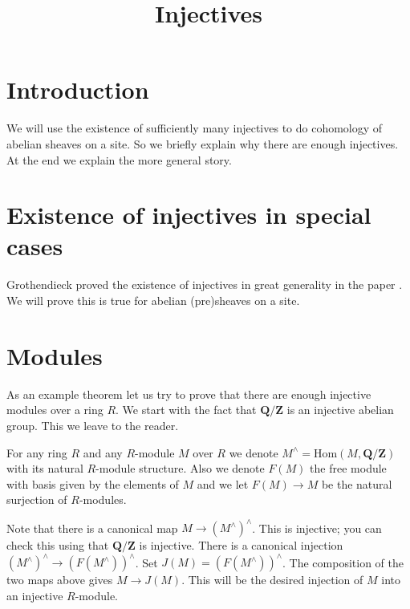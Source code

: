 

%


\title{Injectives}


\maketitle

\tableofcontents

\section{Introduction}
\label{section-introduction}

\noindent
We will use the existence of sufficiently many injectives to
do cohomology of abelian sheaves on a site. So we briefly 
explain why there are enough injectives. At the end we explain
the more general story.

\section{Existence of injectives in special cases}
\label{section-foundational}

\noindent
Grothendieck proved the existence of injectives in great generality 
in the paper \cite{Tohoku}. We will prove this is true for abelian
(pre)sheaves on a site.

\section{Modules}
\label{section-injectives-modules}

\noindent 
As an example theorem let us try to prove that there are enough injective
modules over a ring $R$. We start with the fact that $\mathbf{Q}/\mathbf{Z}$ 
is an injective abelian group. This we leave to the reader.

\medskip\noindent
For any ring $R$ and any $R$-module $M$ over $R$ we denote 
$M^\wedge = \text{Hom}(M,\mathbf{Q}/\mathbf{Z})$
with its natural $R$-module structure. Also we denote
$F(M)$ the free module with basis given by the elements 
of $M$ and we let $F(M)\to M$ be the natural surjection of $R$-modules.

\medskip\noindent
Note that there is a canonical map $M \to (M^\wedge)^\wedge$.
This is injective; you can check this using that 
$\mathbf{Q}/\mathbf{Z}$ is injective. There is a canonical 
injection $(M^\wedge)^\wedge \to (F(M^\wedge))^\wedge$.
Set $J(M)=(F(M^\wedge))^\wedge$. The composition of the two maps
above gives $M \to J(M)$. This will be the desired injection of $M$ 
into an injective $R$-module.

